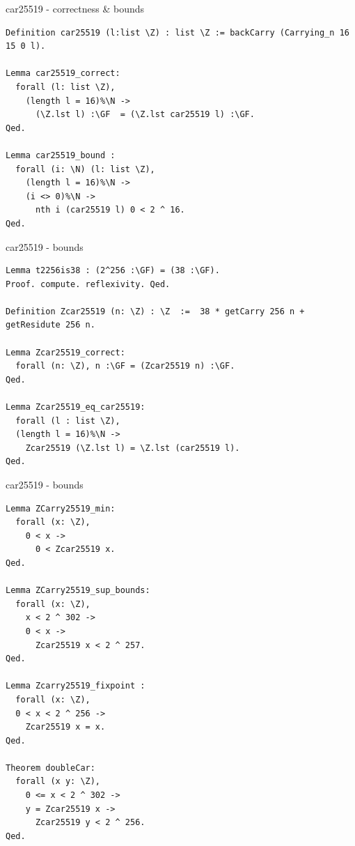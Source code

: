 \documentclass[8pt]{beamer}
\begin{document}
%
%

\begin{frame}[fragile]{car25519 - correctness \& bounds}
  \begin{center}
\begin{lstlisting}[language=Coq, caption=car25519 | Proofs of correctness, label=cod:languageC171]
Definition car25519 (l:list \Z) : list \Z := backCarry (Carrying_n 16 15 0 l).

Lemma car25519_correct:
  forall (l: list \Z),
    (length l = 16)%\N ->
      (\Z.lst l) :\GF  = (\Z.lst car25519 l) :\GF.
Qed.

Lemma car25519_bound :
  forall (i: \N) (l: list \Z),
    (length l = 16)%\N ->
    (i <> 0)%\N ->
      nth i (car25519 l) 0 < 2 ^ 16.
Qed.
\end{lstlisting}
  \end{center}
\end{frame}



%
%

\begin{frame}[fragile]{car25519 - bounds}
  \begin{center}
\begin{lstlisting}[language=Coq, caption=car25519, label=cod:languageC181]
Lemma t2256is38 : (2^256 :\GF) = (38 :\GF).
Proof. compute. reflexivity. Qed.

Definition Zcar25519 (n: \Z) : \Z  :=  38 * getCarry 256 n +  getResidute 256 n.

Lemma Zcar25519_correct:
  forall (n: \Z), n :\GF = (Zcar25519 n) :\GF.
Qed.

Lemma Zcar25519_eq_car25519:
  forall (l : list \Z),
  (length l = 16)%\N ->
    Zcar25519 (\Z.lst l) = \Z.lst (car25519 l).
Qed.
\end{lstlisting}

  \end{center}
\end{frame}


%
%

\begin{frame}[fragile]{car25519 - bounds}
  \begin{center}
\begin{lstlisting}[language=Coq, caption=car25519, label=cod:languageC191]
Lemma ZCarry25519_min:
  forall (x: \Z),
    0 < x ->
      0 < Zcar25519 x.
Qed.

Lemma ZCarry25519_sup_bounds:
  forall (x: \Z),
    x < 2 ^ 302 ->
    0 < x ->
      Zcar25519 x < 2 ^ 257.
Qed.

Lemma Zcarry25519_fixpoint :
  forall (x: \Z),
  0 < x < 2 ^ 256 ->
    Zcar25519 x = x.
Qed.

Theorem doubleCar:
  forall (x y: \Z),
    0 <= x < 2 ^ 302 ->
    y = Zcar25519 x ->
      Zcar25519 y < 2 ^ 256.
Qed.
\end{lstlisting}

  \end{center}
\end{frame}
\end{document}

